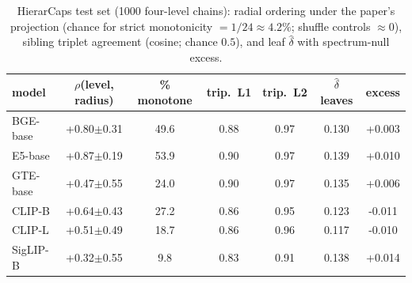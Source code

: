 \begin{table}[H]
\centering
\small
\begin{tabular}{lcccccc}
\toprule
model & $\rho$(level, radius) & \% monotone & trip.\ L1 & trip.\ L2 & $\hat\delta$ leaves & excess \\
\midrule
BGE-base & +0.80$\pm$0.31 & 49.6 & 0.88 & 0.97 & 0.130 & +0.003 \\
E5-base & +0.87$\pm$0.19 & 53.9 & 0.90 & 0.97 & 0.139 & +0.010 \\
GTE-base & +0.47$\pm$0.55 & 24.0 & 0.90 & 0.97 & 0.135 & +0.006 \\
CLIP-B & +0.64$\pm$0.43 & 27.2 & 0.86 & 0.95 & 0.123 & -0.011 \\
CLIP-L & +0.51$\pm$0.49 & 18.7 & 0.86 & 0.96 & 0.117 & -0.010 \\
SigLIP-B & +0.32$\pm$0.55 & 9.8 & 0.83 & 0.91 & 0.138 & +0.014 \\
\bottomrule
\end{tabular}
\caption{HierarCaps test set (1000 four-level chains): radial ordering under the paper's projection (chance for strict monotonicity $=1/24\approx4.2\%$; shuffle controls $\approx 0$), sibling triplet agreement (cosine; chance $0.5$), and leaf $\hat\delta$ with spectrum-null excess.}
\label{tab:a8}
\end{table}
